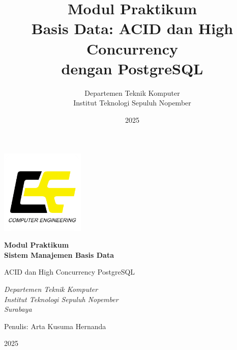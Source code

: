 \title{\Huge \textbf{Modul Praktikum\\Basis Data: ACID dan High Concurrency\\dengan PostgreSQL}}
\author{Departemen Teknik Komputer\\Institut Teknologi Sepuluh Nopember}
\date{2025}

\begin{titlepage}
    \centering
    \vspace*{1cm}
    {\includegraphics[width=0.3\textwidth]{logo-tekkom.png}\par}
    \vspace{1.5cm}
    {\huge\bfseries Modul Praktikum\\Sistem Manajemen Basis Data\par}
    \vspace{1cm}
    {\Large  ACID dan High Concurrency PostgreSQL\par}
    \vspace{2cm}
    {\Large\itshape Departemen Teknik Komputer\\Institut Teknologi Sepuluh Nopember\\Surabaya\par}
    \vfill
    {\large Penulis: Arta Kusuma Hernanda\par}
    \vspace{0.5cm}
    {\large 2025\par}
\end{titlepage}